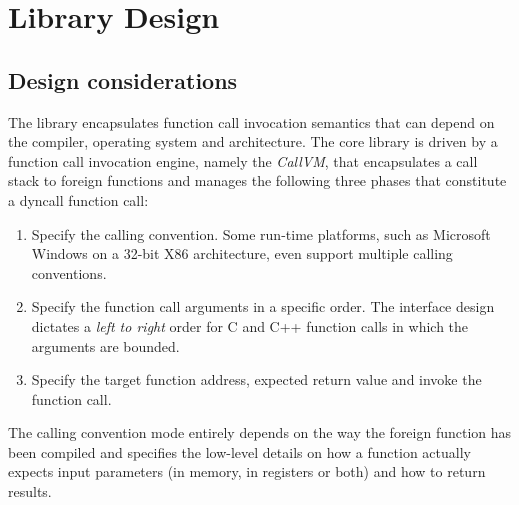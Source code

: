 \newpage
\section{Library Design}


\subsection{Design considerations}

The  library encapsulates function call invocation semantics
that can depend on the compiler, operating system and architecture.
The core library is driven by a function call invocation engine, 
namely the \emph{CallVM}, that encapsulates a call stack to foreign functions 
and manages the following three phases that constitute a dyncall function call:

\begin{enumerate}
\item Specify the calling convention. Some run-time platforms, such as
Microsoft Windows on a 32-bit X86 architecture, even support multiple calling
conventions.
\item Specify the function call arguments in a specific order. The 
interface design dictates a \emph{left to right} order for C and C++ function 
calls in which the arguments are bounded.
\item Specify the target function address, expected return value and 
invoke the function call.
\end{enumerate}

The calling convention mode entirely depends on the way the foreign function
has been compiled and specifies the low-level details on how a function
actually expects input parameters (in memory, in registers or both) and how to
return results.


